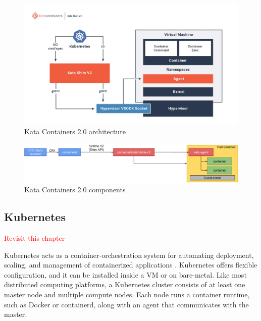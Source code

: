 \begin{figure}[ht]
  \begin{center}
    \includegraphics[width=13.5cm]{images/KataContainersArchitecture.jpg}
    \caption{Kata Containers 2.0 architecture \cite{KataContainers}}
    \label{fig:KataContainersArchitecture}
  \end{center}
\end{figure}

\begin{figure}[ht]
  \begin{center}
    \includegraphics[width=13.5cm]{images/KataContainersComponents.png}
    \caption{Kata Containers 2.0 components \cite{KataContainersArchitecture}}
    \label{fig:KataContainersComponents}
  \end{center}
\end{figure}

\subsection{Kubernetes}
\textcolor{red}{Revisit this chapter}

Kubernetes acts as a container-orchestration system for automating deployment, scaling, and management of containerized applications \cite{Kubernetes}. Kubernetes offers flexible configuration, and it can be installed inside a VM or on bare-metal. Like most distributed computing platforms, a Kubernetes cluster consists of at least one master node and multiple compute nodes. Each node runs a container runtime, such as Docker or containerd, along with an agent that communicates with the master.

